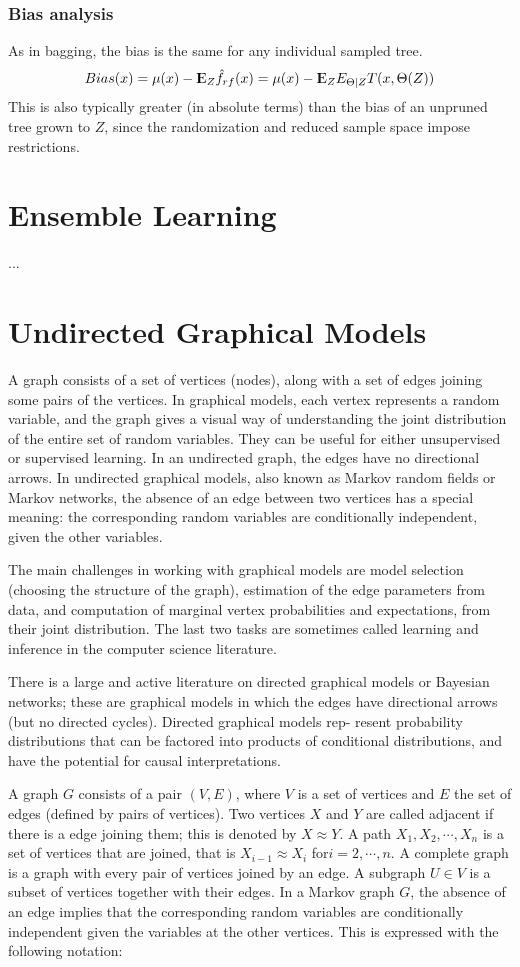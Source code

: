 \documentclass[12pt, letterpaper]{article}
\theoremstyle{definition}
\newcommand{\E}{{\rm I\kern-.3em E}}
\begin{document}
\subsubsection{Bias analysis}
As in bagging, the bias is the same for any individual sampled tree.
\begin{equation}
Bias(x) = \mu(x) - \E_Z\hat{f}_{rf}(x) = \mu(x) - \E_Z E_{\Theta|Z}T(x, \Theta(Z))
\end{equation}
This is also typically greater (in absolute terms) than the bias of an unpruned tree grown to $Z$, since the randomization and reduced sample space impose restrictions.

\section{Ensemble Learning}
...
\section{Undirected Graphical Models}

A graph consists of a set of vertices (nodes), along with a set of edges joining some pairs of the vertices. In graphical models, each vertex represents a random variable, and the graph gives a visual way of understanding the joint distribution of the entire set of random variables. They can be useful for either unsupervised or supervised learning. In an undirected graph, the edges have no directional arrows. In undirected graphical models, also known as Markov random fields or Markov networks, the absence of an edge between two vertices has a special meaning: the corresponding random variables are conditionally independent, given the other variables.

The main challenges in working with graphical models are model selection (choosing the structure of the graph), estimation of the edge parameters from data, and computation of marginal vertex probabilities and expectations, from their joint distribution. The last two tasks are sometimes called learning and inference in the computer science literature.

There is a large and active literature on directed graphical models or Bayesian networks; these are graphical models in which the edges have directional arrows (but no directed cycles). Directed graphical models rep- resent probability distributions that can be factored into products of conditional distributions, and have the potential for causal interpretations.

 A graph $G$ consists of a pair $(V, E)$, where $V$ is a set of vertices and $E$ the set of edges (defined by pairs of vertices). Two vertices $X$ and $Y$ are called adjacent if there is a edge joining them; this is denoted by $X \approx Y$. A path $X_1,X_2,\cdots,X_n$ is a set of vertices that are joined, that is $X_{i-1} \approx X_i$ for$ i = 2,\cdots,n$. A complete graph is a graph with every pair of vertices joined by an edge. A subgraph $U \in V$ is a subset of vertices together with their edges.
In a Markov graph $G$, the absence of an edge implies that the corresponding random variables are conditionally independent given the variables at the other vertices. This is expressed with the following notation:
\end{document}
